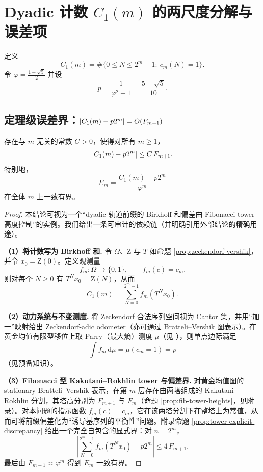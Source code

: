 
\section{Dyadic 计数 \texorpdfstring{$C_1(m)$}{C\_1(m)} 的两尺度分解与误差项}

定义
$$
C_1(m)=\#\Big\{0\le N\le 2^m-1:\ c_m(N)=1\Big\}.
$$
令 $\varphi=\frac{1+\sqrt5}{2}$ 并设
$$
p=\frac{1}{\varphi^2+1}=\frac{5-\sqrt5}{10}.
$$

\subsection{定理级误差界：\texorpdfstring{$\left\lvert C_1(m)-p2^m\right\rvert=O(F_{m+1})$}{|C1(m)-p2^m|=O(F_{m+1})}}

\begin{theorem}\label{thm:dyadic-C1-bound}
存在与 $m$ 无关的常数 $C>0$，使得对所有 $m\ge 1$，
$$
\left\lvert C_1(m)-p2^m\right\rvert\le C\,F_{m+1}.
$$
特别地，
$$
E_m=\frac{C_1(m)-p2^m}{\varphi^m}
$$
在全体 $m$ 上一致有界。
\end{theorem}

\begin{proof}
本结论可视为一个“dyadic 轨道前缀的 Birkhoff 和偏差由 Fibonacci tower 高度控制”的实例。我们给出一条可审计的依赖链（并明确引用外部结论的精确用途）。

\textbf{（1）将计数写为 Birkhoff 和.}
令 $\Omega$、$\mathrm{Z}$ 与 $T$ 如命题 \ref{prop:zeckendorf-vershik}，并令 $x_0=\mathrm{Z}(0)$。定义观测量
$$
f_m:\Omega\to\{0,1\},\qquad f_m(c)=c_m.
$$
则对每个 $N\ge 0$ 有 $T^N x_0=\mathrm{Z}(N)$，从而
$$
C_1(m)=\sum_{N=0}^{2^m-1} f_m(T^N x_0).
$$

\textbf{（2）动力系统与不变测度.}
将 Zeckendorf 合法序列空间视为 Cantor 集，并用“加一”映射给出 Zeckendorf-adic odometer（亦可通过 Bratteli--Vershik 图表示）。在黄金均值有限型移位上取 Parry（最大熵）测度 $\mu$（见 \cite{lind1995symbolic}），则单点边际满足
$$
\int f_m\,\mathrm{d}\mu=\mu(c_m=1)=p
$$
（见预备知识）。

\textbf{（3）Fibonacci 型 Kakutani--Rokhlin tower 与偏差界.}
对黄金均值图的 stationary Bratteli--Vershik 表示，在第 $m$ 层存在由两塔组成的 Kakutani--Rokhlin 分割，其塔高分别为 $F_{m+1}$ 与 $F_m$（命题 \ref{prop:fib-tower-heights}，见附录）。对本问题的指示函数 $f_m(c)=c_m$，它在该两塔分割下在整塔上为常值，从而可将前缀偏差化为“诱导基序列的平衡性”问题。附录命题 \ref{prop:tower-explicit-discrepancy} 给出一个完全自包含的显式界：对 $n=2^m$，
$$
\left|\sum_{N=0}^{2^m-1} f_m(T^N x_0)-p2^m\right|\le 4\,F_{m+1}.
$$
最后由 $F_{m+1}\asymp \varphi^m$ 得到 $E_m$ 一致有界。
\end{proof}

